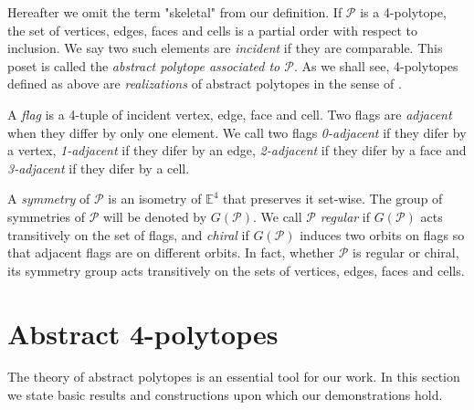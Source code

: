 \documentclass{article}
\theoremstyle{definition}
\newcommand{\E}{\mathbb{E}}
\newcommand{\p}{\mathcal{P}}
\begin{document}
	Hereafter we omit the term "skeletal" from our definition. If $\p$ is a 4-polytope, the set of vertices, edges, faces and cells is a partial order with respect to inclusion. We say two such elements are \textit{incident} if they are comparable. This poset is called the \textit{abstract polytope associated to $\p$}. As we shall see, 4-polytopes defined as above are \textit{realizations} of abstract polytopes in the sense of .
	
	A \textit{flag} is a 4-tuple of incident vertex, edge, face and cell. Two flags are \textit{adjacent} when they differ by only one element. We call two flags \textit{0-adjacent} if they difer by a vertex, \textit{1-adjacent} if they difer by an edge, \textit{2-adjacent} if they difer by a face and \textit{3-adjacent} if they difer by a cell.
	
	A \textit{symmetry} of $\p$ is an isometry of $\E^4$ that preserves it set-wise. The group of symmetries of $\p$ will be denoted by $G(\p)$. We call $\p$ \textit{regular} if $G(\p)$ acts transitively on the set of flags, and \textit{chiral} if $G(\p)$ induces two orbits on flags so that adjacent flags are on different orbits. In fact, whether $\p$ is regular or chiral, its symmetry group acts transitively on the sets of vertices, edges, faces and cells.
	

	
\section{Abstract 4-polytopes}\label{sec:abstract-defs}
	The theory of abstract polytopes is an essential tool for our work. In this section we state basic results and constructions upon which our demonstrations hold.
	
\end{document}
